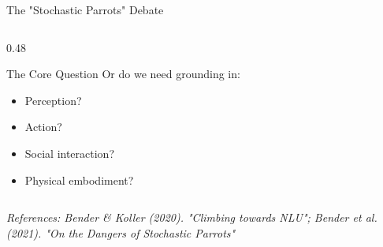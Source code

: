 \documentclass[aspectratio=169]{beamer}
\begin{document}
\begin{frame}[shrink=10]{The "Stochastic Parrots" Debate 🦜}
\begin{columns}[T]
\begin{column}{0.48\textwidth}
\begin{alertblock}{The Core Question}
\vspace{0.3em}
Or do we need grounding in:
\begin{itemize}\setlength{\itemsep}{0pt}
    \item Perception?
    \item Action?
    \item Social interaction?
    \item Physical embodiment?
\end{itemize}
\end{alertblock}
\end{column}
\end{columns}

\vspace{0.5em}
\small
\textit{References: Bender \& Koller (2020). "Climbing towards NLU"; Bender et al. (2021). "On the Dangers of Stochastic Parrots"}
\end{frame}
\end{document}
